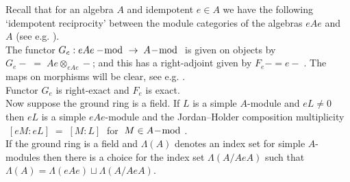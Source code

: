 \documentclass[reqno,10pt,a4paper]{amsart}
\newcommand{\red}[1]{\textcolor{red}{#1}}
\newcommand{\ppm}[1]{\red{#1}}
\newcommand{\ppmm}[1]{{#1}}
\newcommand{\ignore}[1]{}
\begin{document}
\mdef  \label{de:GFfunctors}
Recall that for an algebra $A$ and idempotent $e \in A$ 
we have the following
`idempotent reciprocity' 
between the module categories of the algebras $eAe$ and $A$ 
(see e.g. 
\cite{green2007polynomial,Martin94,amm2019tonal}). 
\\ 
The functor 
$G_e : eAe-\!\!\!\!\!\mod \rightarrow \; A\!-\!\!\!\!\!\mod$ 
is given 
on objects
by 
$G_e - \; = \; Ae \otimes_{eAe} -$;
and this has a right-adjoint given by $F_e - = e- \;$.
The maps on 
morphisms will be clear, 
see e.g. \cite{CurtisReiner62,Martin91}.
\\ 
Functor $G_e$ is right-exact and $F_e$ is exact.
\\ 
Now suppose the ground ring is a field.
If $L$ is a simple $A$-module and $eL \neq 0$ then 
$eL$ is a simple $eAe$-module and 
the Jordan--Holder composition multiplicity 
$ \;  [eM : eL] \; = \;  [M : L] \; $
for $ \; M \in A\!-\!\!\!\!\!\mod$.
\\
If the ground ring is a field and 
$\Lambda(A)$ denotes an index set for simple $A$-modules then there is a choice for the index set $\Lambda(A/AeA)$ such that 
$\Lambda(A) = \Lambda(eAe) \sqcup \Lambda(A/AeA)$.





\medskip 





%  

\ignore{{ 

\subsection{How things work for the ordinary partition algebra}   $\;$ 

In this paper we follow the original method that works for
the partition algebras themselves.
In this subsection we assume familiarity with the partition algebra, and can then give a convenient brief overview of our approach in terms of the partition algebra case.

}}



\end{document}
